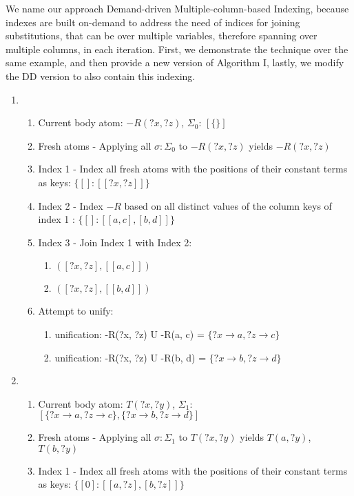 \documentclass[sigconf,screen,review=false,natbib]{acmart}
\theoremstyle{definition}
\begin{document}
We name our approach Demand-driven Multiple-column-based Indexing, because indexes are built on-demand to address the need of indices for
joining substitutions, that can be over multiple variables, therefore spanning over multiple columns, in each iteration. First, we demonstrate
the technique over the same example, and then provide a new version of Algorithm I, lastly, we modify the DD version to
also contain this indexing.
\begin{enumerate}
	\item \begin{enumerate}
		      \item Current body atom: $-R(?x, ?z)$, $\Sigma_0$: $[\{\}]$
		      \item Fresh atoms - Applying all $\sigma : \Sigma_0$ to $-R(?x, ?z)$ yields $-R(?x, ?z)$
		      \item Index 1 - Index all fresh atoms with the positions of their constant terms as keys: $\{[] : [[?x, ?z]]\}$
		      \item Index 2 - Index $-R$ based on all distinct values of the column keys of index 1 : $\{[]: [[a, c], [b, d]]\}$
		      \item Index 3 - Join Index 1 with Index 2:
		            \begin{enumerate}
			            \item $([?x, ?z], [[a, c]])$
			            \item $([?x, ?z], [[b, d]])$
		            \end{enumerate}
		      \item Attempt to unify:
		            \begin{enumerate}
			            \item unification: -R(?x, ?z) U -R(a, c) = $\{?x \rightarrow a, ?z \rightarrow c\}$
			            \item unification: -R(?x, ?z) U -R(b, d) = $\{?x \rightarrow b, ?z \rightarrow d\}$
		            \end{enumerate}
	      \end{enumerate}
	\item \begin{enumerate}
		      \item Current body atom: $T(?x, ?y)$, $\Sigma_1$: $[\{?x \rightarrow a, ?z \rightarrow c\}, \{?x \rightarrow b, ?z \rightarrow d\}]$
		      \item Fresh atoms - Applying all $\sigma : \Sigma_1$ to $T(?x, ?y)$ yields $T(a, ?y)$, $T(b, ?y)$
		      \item Index 1 - Index all fresh atoms with the positions of their constant terms as keys: $\{[0] : [[a, ?z], [b, ?z]]\}$

\end{enumerate}
\end{enumerate}
\end{document}
